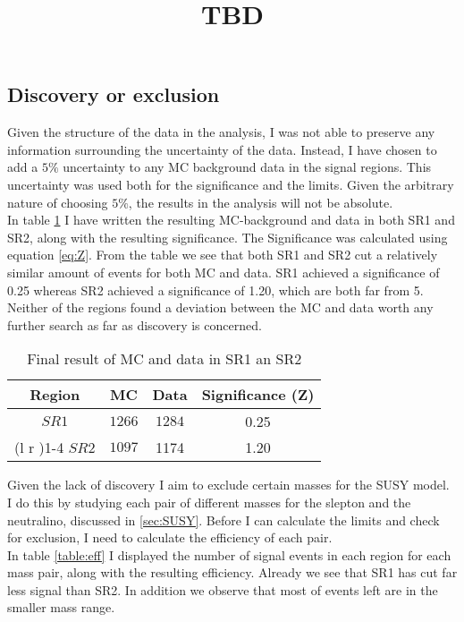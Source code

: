 \documentclass{article}
\begin{document}
\subsection{Discovery or exclusion}\label{subsec:DoE}
Given the structure of the data in the analysis, I was not able to preserve any information surrounding the uncertainty of the data. Instead, I have chosen to add a $5\%$ uncertainty to any MC background data in the signal regions. This uncertainty was used both for the significance and the limits. Given the arbitrary nature of choosing $5\%$, the results in the analysis will not be absolute.
\\
In table \ref{table:SR1_SR2} I have written the resulting MC-background and data in both SR1 and SR2, along with the resulting significance. The Significance was calculated using equation \ref{eq:Z}. From the table we see that both SR1 and SR2 cut a relatively similar amount of events for both MC and data. SR1 achieved a significance of 0.25 whereas SR2 achieved a significance of 1.20, which are both far from 5. Neither of the regions found a deviation between the MC and data worth any further search as far as discovery is concerned.
\\
\bgroup
\title{TBD}
{\tabcolsep=20pt
\begin{table}
    \caption{Final result of MC and data in SR1 an SR2}
    \label{table:SR1_SR2}
    \centering 
    \begin{threeparttable}
    \begin{tabular}{cccc}
    \textbf{Region} & \textbf{MC} & \textbf{Data} & \textbf{Significance (Z)}\\
    \midrule\midrule
    $SR1$   & $1266$ &  $1284$ & 0.25 \\%
    \cmidrule(l  r ){1-4}
    $SR2$ & $1097$ &  1174 & 1.20 \\ 
    \midrule\midrule
    \end{tabular}
    \end{threeparttable}
\end{table}
}
\egroup
Given the lack of discovery I aim to exclude certain masses for the SUSY model. I do this by studying each pair of different masses for the slepton and the neutralino, discussed in \ref{sec:SUSY}. Before I can calculate the limits and check for exclusion, I need to calculate the efficiency of each pair. 
\\
In table \ref{table:eff} I displayed the number of signal events in each region for each mass pair, along with the resulting efficiency. Already we see that SR1 has cut far less signal than SR2. In addition we observe that most of events left are in the smaller mass range. 
\end{document}
